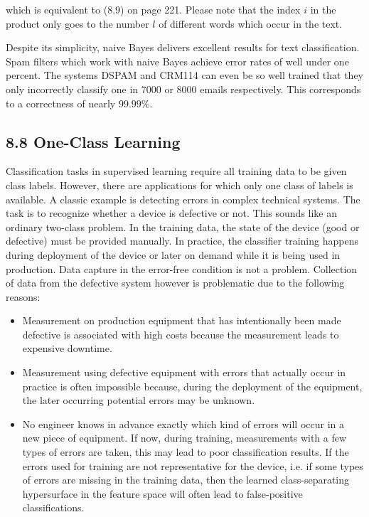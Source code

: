 \documentclass[10pt]{article}
\begin{document}
which is equivalent to (8.9) on page 221. Please note that the index $i$ in the product only goes to the number $l$ of different words which occur in the text.

Despite its simplicity, naive Bayes delivers excellent results for text classification. Spam filters which work with naive Bayes achieve error rates of well under one percent. The systems DSPAM and CRM114 can even be so well trained that they only incorrectly classify one in 7000 or 8000 emails respectively. This corresponds to a correctness of nearly $99.99 \%$.

\subsection*{8.8 One-Class Learning}
Classification tasks in supervised learning require all training data to be given class labels. However, there are applications for which only one class of labels is available. A classic example is detecting errors in complex technical systems. The task is to recognize whether a device is defective or not. This sounds like an ordinary two-class problem. In the training data, the state of the device (good or defective) must be provided manually. In practice, the classifier training happens during deployment of the device or later on demand while it is being used in production. Data capture in the error-free condition is not a problem. Collection of data from the defective system however is problematic due to the following reasons:

\begin{itemize}
  \item Measurement on production equipment that has intentionally been made defective is associated with high costs because the measurement leads to expensive downtime.
  \item Measurement using defective equipment with errors that actually occur in practice is often impossible because, during the deployment of the equipment, the later occurring potential errors may be unknown.
  \item No engineer knows in advance exactly which kind of errors will occur in a new piece of equipment. If now, during training, measurements with a few types of errors are taken, this may lead to poor classification results. If the errors used for training are not representative for the device, i.e. if some types of errors are missing in the training data, then the learned class-separating hypersurface in the feature space will often lead to false-positive classifications.
\end{itemize}
\end{document}
